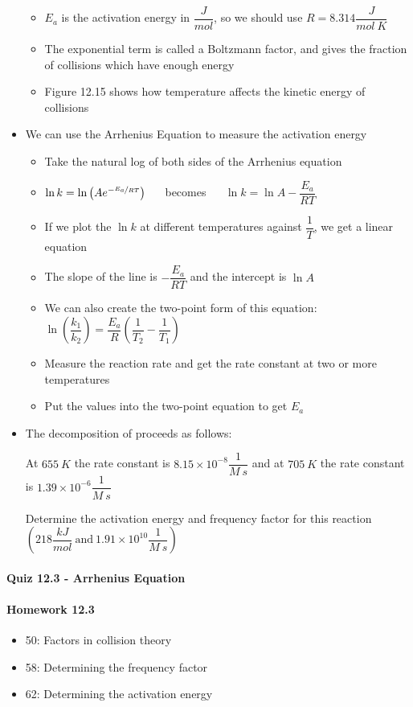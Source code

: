 \documentclass[12pt, openany, letterpaper]{memoir}
\begin{document}
\begin{itemize}
\begin{itemize}
		\item $E_a$ is the activation energy in $\dfrac{J}{mol}$, so we should use $R=8.314\dfrac{J}{mol~K}$
		\item The exponential term is called a Boltzmann factor, and gives the fraction of collisions which have enough energy
		\item Figure 12.15 shows how temperature affects the kinetic energy of collisions
	\end{itemize}
	\item We can use the Arrhenius Equation to measure the activation energy
	\begin{itemize}
		\item Take the natural log of both sides of the Arrhenius equation
		\item $\ln k=\ln\left(Ae^{-\nicefrac{E_a}{RT}}\right)$ ~~ becomes ~~ $\ln k = \ln A - \dfrac{E_a}{RT}$
		\item If we plot the $\ln k$ at different temperatures against $\dfrac{1}{T}$, we get a linear equation
		\item The slope of the line is $-\dfrac{E_a}{RT}$ and the intercept is $\ln A$
		\item We can also create the two-point form of this equation: $\ln\left(\dfrac{k_1}{k_2}\right)=\dfrac{E_a}{R}\left(\dfrac{1}{T_2}-\dfrac{1}{T_1}\right)$
		\item Measure the reaction rate and get the rate constant at two or more temperatures
		\item Put the values into the two-point equation to get $E_a$		
	\end{itemize}
	\item The decomposition of  proceeds as follows: 
	
	At $655~K$ the rate constant is $8.15\times10^{-8}\dfrac{1}{M~s}$ and at $705~K$ the rate constant is $1.39\times10^{-6}\dfrac{1}{M~s}$
	
	Determine the activation energy and frequency factor for this reaction $\left(218\dfrac{kJ}{mol}~\mathrm{and}~1.91\times10^{10}\dfrac{1}{M~s}\right)$
\end{itemize}

\paragraph*{Quiz 12.3 - Arrhenius Equation}
\paragraph*{Homework 12.3}
\begin{itemize}
  \item 50: Factors in collision theory
  \item 58: Determining the frequency factor
  \item 62: Determining the activation energy
\end{itemize}
\end{document}
